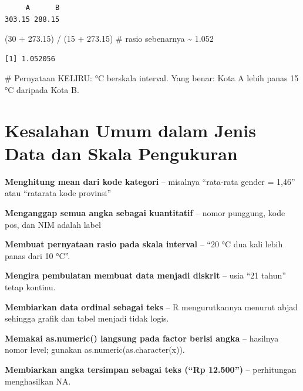 \documentclass[
  indonesian,
  letterpaper,
]{book}
\newenvironment{Shaded}{\begin{snugshade}}{\end{snugshade}}
\newcommand{\CommentTok}[1]{\textcolor[rgb]{0.37,0.37,0.37}{#1}}
\newcommand{\DecValTok}[1]{\textcolor[rgb]{0.68,0.00,0.00}{#1}}
\newcommand{\FloatTok}[1]{\textcolor[rgb]{0.68,0.00,0.00}{#1}}
\newcommand{\NormalTok}[1]{\textcolor[rgb]{0.00,0.23,0.31}{#1}}
\newcommand{\SpecialCharTok}[1]{\textcolor[rgb]{0.37,0.37,0.37}{#1}}
\begin{document}
\begin{verbatim}
     A      B 
303.15 288.15 
\end{verbatim}

\begin{Shaded}
\begin{Highlighting}[]
\NormalTok{(}\DecValTok{30} \SpecialCharTok{+} \FloatTok{273.15}\NormalTok{) }\SpecialCharTok{/}\NormalTok{ (}\DecValTok{15} \SpecialCharTok{+} \FloatTok{273.15}\NormalTok{) }\CommentTok{\# rasio sebenarnya \textasciitilde{} 1.052}
\end{Highlighting}
\end{Shaded}

\begin{verbatim}
[1] 1.052056
\end{verbatim}

\begin{Shaded}
\begin{Highlighting}[]
\CommentTok{\# Pernyataan KELIRU: °C berskala interval. Yang benar: Kota A lebih panas 15 °C daripada Kota B.}
\end{Highlighting}
\end{Shaded}

\section{Kesalahan Umum dalam Jenis Data dan Skala
Pengukuran}\label{kesalahan-umum-dalam-jenis-data-dan-skala-pengukuran}

\textbf{Menghitung mean dari kode kategori} -- misalnya ``rata-rata
gender = 1,46'' atau ``ratarata kode provinsi''

\textbf{Menganggap semua angka sebagai kuantitatif} -- nomor punggung,
kode pos, dan NIM adalah label

\textbf{Membuat pernyataan rasio pada skala interval} -- ``20 °C dua
kali lebih panas dari 10 °C''.

\textbf{Mengira pembulatan membuat data menjadi diskrit} -- usia ``21
tahun'' tetap kontinu.

\textbf{Membiarkan data ordinal sebagai teks} -- R mengurutkannya
menurut abjad sehingga grafik dan tabel menjadi tidak logis.

\textbf{Memakai as.numeric() langsung pada factor berisi angka} --
hasilnya nomor level; gunakan as.numeric(as.character(x)).

\textbf{Membiarkan angka tersimpan sebagai teks (``Rp 12.500'')} --
perhitungan menghasilkan NA.
\end{document}
